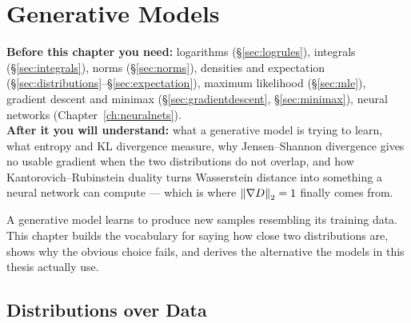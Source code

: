 \chapter{Generative Models}
\label{ch:generative}

\begin{tcolorbox}[feynbox={Sky}{BBg},title={Before and After}]
\textbf{Before this chapter you need:} logarithms (\S\ref{sec:logrules}),
integrals (\S\ref{sec:integrals}), norms (\S\ref{sec:norms}), densities and
expectation (\S\ref{sec:distributions}--\S\ref{sec:expectation}), maximum
likelihood (\S\ref{sec:mle}), gradient descent and minimax
(\S\ref{sec:gradientdescent}, \S\ref{sec:minimax}), neural networks
(Chapter~\ref{ch:neuralnets}).\\
\textbf{After it you will understand:} what a generative model is trying to
learn, what entropy and KL divergence measure, why Jensen--Shannon divergence
gives no usable gradient when the two distributions do not overlap, and how
Kantorovich--Rubinstein duality turns Wasserstein distance into something a
neural network can compute --- which is where $\left\|\nabla D\right\|_2 = 1$ finally
comes from.
\end{tcolorbox}

A generative model learns to produce new samples resembling its training data.
This chapter builds the vocabulary for saying how close two distributions are,
shows why the obvious choice fails, and derives the alternative the models in
this thesis actually use.

\section{Distributions over Data}
\label{sec:datadist}



